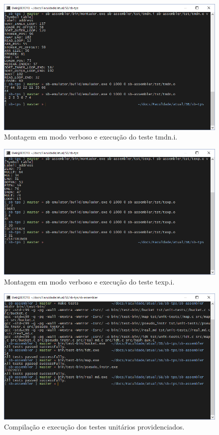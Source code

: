 \documentclass[10pt,a4paper]{article}
\numberwithin{equation}{section}
\begin{document}
\begin{figure}[h]
    \includegraphics[scale=0.65]{imagens/tmdn_console.png}
    \centering
    \caption{Montagem em modo verboso e execução do teste tmdn.i.}
\end{figure}

\begin{figure}[h]
    \includegraphics[scale=0.65]{imagens/texp_console.png}
    \centering
    \caption{Montagem em modo verboso e execução do teste texp.i.}
\end{figure}

\begin{figure}[h]
    \includegraphics[scale=0.65]{imagens/unit_tests_console.png}
    \centering
    \caption{Compilação e execução dos testes unitários providenciados.}
\end{figure}
\end{document}
